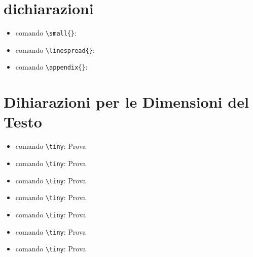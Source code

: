 \documentclass{article}
\begin{document}
        \section{dichiarazioni}
            \begin{itemize}
                \item comando \verb!\small{}!:        %
                \item comando \verb!\linespread{}!:   %
                \item comando \verb!\appendix{}!:     %
            \end{itemize}

        \section{Dihiarazioni per le Dimensioni del Testo}
            \begin{itemize}
                \item comando \verb!\tiny!: {\tiny Prova}
                \item comando \verb!\tiny!: {\footnotesize Prova}
                \item comando \verb!\tiny!: {\normalsize Prova}
                \item comando \verb!\tiny!: {\large Prova}
                \item comando \verb!\tiny!: {\Large Prova}
                \item comando \verb!\tiny!: {\LARGE Prova}
                \item comando \verb!\tiny!: {\huge Prova}
            \end{itemize}
\end{document}
